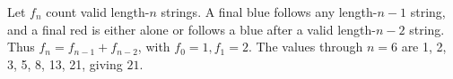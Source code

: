 Let $f_n$ count valid length-$n$ strings. A final blue follows any length-$n-1$ string, and a final red is either alone or follows a blue after a valid length-$n-2$ string. Thus $f_n=f_{n-1}+f_{n-2}$, with $f_0=1,f_1=2$. The values through $n=6$ are 1, 2, 3, 5, 8, 13, 21, giving $\boxed{21}$.
